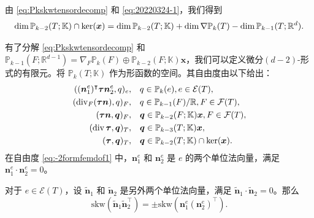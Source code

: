由 \eqref{eq:Pkskwtensordecomp} 和 \eqref{eq:20220324-1}，我们得到
\begin{equation}\label{eq:20220324-2}
\operatorname{dim}\mathbb P_{k-2}(T;\mathbb K)\cap\ker(\boldsymbol{x})=\operatorname{dim}\mathbb P_{k-2}(T;\mathbb K)+\operatorname{dim}\nabla\mathbb P_k(T)- \operatorname{dim}\mathbb P_{k-1}(T;\mathbb R^d).
\end{equation}

有了分解 \eqref{eq:Pkskwtensordecomp} 和 $\mathbb{P}_{k-1}(F;\mathbb
R^{d-1})=\nabla_F \mathbb{P}_k(F)\oplus\mathbb P_{k-2}(F;\mathbb
K)\boldsymbol{x}$，我们可以定义微分$(d-2)$-形式的有限元。将 $\mathbb
P_k(T;\mathbb K)$ 作为形函数的空间。其自由度由以下给出：
\begin{align}
((\boldsymbol{n}_1^e)^{\intercal}\boldsymbol{\tau}\boldsymbol{n}_2^e, q)_e, & \quad q\in \mathbb P_k(e), e\in\mathcal E(T), \label{eq:-2formfemdof1} \\
(\operatorname{div}_F(\boldsymbol{\tau}\boldsymbol{n}), q)_F, & \quad q\in \mathbb P_{k-1}(F)/\mathbb R, F\in\mathcal F(T), \label{eq:-2formfemdof21} \\
(\boldsymbol{\tau}\boldsymbol{n}, \boldsymbol{q})_F, & \quad \boldsymbol{q}\in \mathbb P_{k-2}(F;\mathbb K)\boldsymbol{x}, F\in\mathcal F(T), \label{eq:-2formfemdof22} \\
(\operatorname{div}\boldsymbol{\tau}, \boldsymbol{q})_T, & \quad \boldsymbol{q}\in\mathbb P_{k-3}(T;\mathbb K)\boldsymbol{x}, \label{eq:-2formfemdof31} \\
(\boldsymbol{\tau}, \boldsymbol{q})_T, & \quad \boldsymbol{q}\in \mathbb P_{k-2}(T;\mathbb K)\cap\ker(\boldsymbol{x}). \label{eq:-2formfemdof32}
\end{align}
在自由度 \eqref{eq:-2formfemdof1} 中，$\boldsymbol{n}_1^e$ 和  $\boldsymbol{n}_2^e$ 是 $e$ 的两个单位法向量，满足 $\boldsymbol{n}_1^e\cdot\boldsymbol{n}_2^e=0$。

\begin{lemma}\label{lem:normalskwtensor}
对于 $e\in\mathcal E(T)$，设 $\tilde{\boldsymbol{n}}_1$ 和  $\tilde{\boldsymbol{n}}_2$ 是另外两个单位法向量，满足 $\tilde{\boldsymbol{n}}_1\cdot\tilde{\boldsymbol{n}}_2=0$。那么
\[
\mathrm{skw}(\tilde{\boldsymbol{n}}_1\tilde{\boldsymbol{n}}_2^{\intercal})=\pm\mathrm{skw}(\boldsymbol{n}_1^e(\boldsymbol{n}_2^e)^{\intercal}).
\]
\end{lemma}

